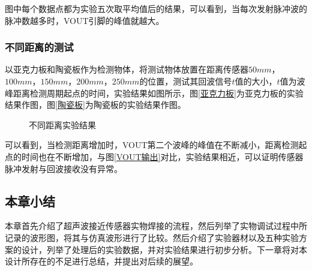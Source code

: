 图中每个数据点都为实验五次取平均值后的结果，可以看到，当每次发射脉冲波的脉冲数越多时，VOUT引脚的峰值就越大。

\subsubsection{不同距离的测试}
以亚克力板和陶瓷板作为检测物体，将测试物体放置在距离传感器$50mm$，$100mm$，$150mm$，$200mm$，$250mm$的位置，测试其回波信号$t$值的大小，$t$值为波峰距离检测周期起点的时间，实验结果如图所示，图\ref{亚克力板}为亚克力板的实验结果作图，图\ref{陶瓷板}为陶瓷板的实验结果作图。
\begin{figure}[!h]
	\centering
	\caption{不同距离实验结果}
	\label{不同距离实验结果}
\end{figure}
可以看到，当检测距离增加时，VOUT第二个波峰的峰值在不断减小，距离检测起点的时间也在不断增加，与图\ref{VOUT输出}对比，实验结果相近，可以证明传感器脉冲发射与回波接收没有异常。
\subsection{本章小结}
本章首先介绍了超声波接近传感器实物焊接的流程，然后列举了实物调试过程中所记录的波形图，将其与仿真波形进行了比较。然后介绍了实验器材以及五种实验方案的设计，列举了处理后的实验数据，并对实验结果进行初步分析。下一章将对本设计所存在的不足进行总结，并提出对后续的展望。







